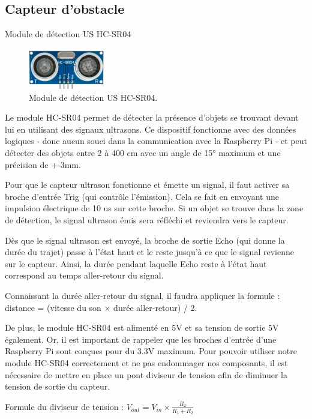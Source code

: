 \documentclass[a4paper,12pt]{report}  %
\begin{document}
\subsection{Capteur d’obstacle}
Module de détection US HC-SR04 
\begin{figure}[H]
	\centering
	\includegraphics[width=0.3\textwidth]{./attachments/capteur_ultrason.jpg}
	\caption{Module de détection US HC-SR04.}
	\label{fig:capteur_us}
	
\end{figure}

Le module HC-SR04 permet de détecter la présence d’objets se trouvant devant lui en utilisant des signaux ultrasons. Ce dispositif fonctionne avec des données logiques - donc aucun souci dans la communication avec la Raspberry Pi - et peut détecter des objets entre 2 à 400 cm avec un angle de 15° maximum et une précision de +-3mm. 

Pour que le capteur ultrason fonctionne et émette un signal, il faut activer sa broche d’entrée Trig (qui contrôle l’émission). Cela se fait en envoyant une impulsion électrique de 10 us sur cette broche. Si un objet se trouve dans la zone de détection, le signal ultrason émis sera réfléchi et reviendra vers le capteur.

Dès que le signal ultrason est envoyé, la broche de sortie Echo (qui donne la durée du trajet) passe à l’état haut et le reste jusqu’à ce que le signal revienne sur le capteur. Ainsi, la durée pendant laquelle Echo reste à l’état haut correspond au temps aller-retour du signal.

Connaissant la durée aller-retour du signal, il faudra appliquer la formule : distance = (vitesse du son × durée aller-retour) / 2.

De plus, le module HC-SR04 est alimenté en 5V et sa tension de sortie 5V également. Or, il est important de rappeler que les broches d’entrée d’une Raspberry Pi sont conçues pour du 3.3V maximum. Pour pouvoir utiliser notre module HC-SR04 correctement et ne pas endommager nos composants, il est nécessaire de mettre en place un pont diviseur de tension afin de diminuer la tension de sortie du capteur.

Formule du diviseur de tension : $V_{out} = V_{in} \times \frac{R_2}{R_1 + R_2}$
\end{document}

